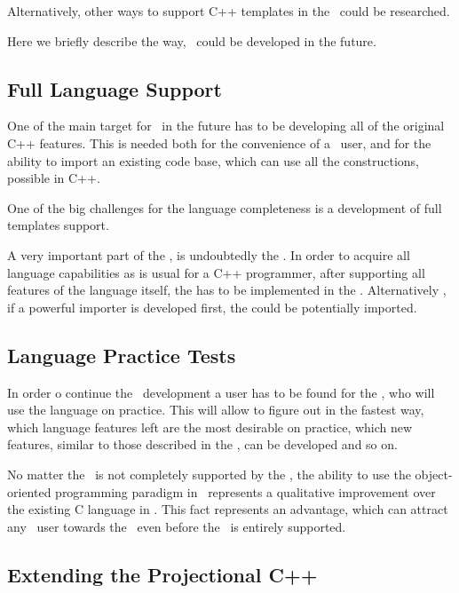 Alternatively, other ways to support C++ templates in the \pcpp\ could be researched.


Here we briefly describe the way, \pcpp\ could be developed in the future.

\subsection{Full Language Support}

One of the main target for \pcpp\ in the future has to be developing 
all of the original C++ features. This is needed both for the convenience of 
a \pcpp\ user, and for the ability to import an existing code base, which 
can use all the constructions, possible in C++.

One of the big challenges for the language completeness is a development 
of full templates support.

A very important part of the \cpppl, is undoubtedly  the . In order to acquire
all language capabilities as is usual for a C++ programmer, after supporting all features
of the language itself, the  has to be implemented in the \pcpp. Alternatively , if a powerful
importer is developed first, the  could be potentially imported. 

\subsection{Language Practice Tests}

In order o continue the \pcpp\ development a user has to be found for the \pcpp, who
will use the language on practice. This will allow to figure out in the fastest way,
which language features left are the most desirable on practice, which new features,
similar to those described in the , can be developed and so on.

No matter the \cpppl\ is not completely supported by the \pcpp, the ability to use the
object-oriented programming paradigm in \mbdr\ represents a qualitative improvement over
the existing C language in \mbdr. This fact represents an advantage, which can
attract any \mbdr\ user towards the \pcpp\ even before the \cpppl\ is entirely supported.

\subsection{Extending the Projectional C++}

